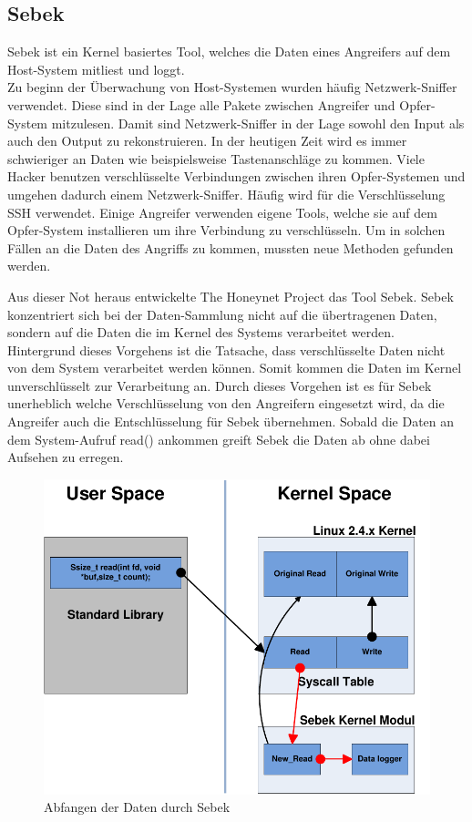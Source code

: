 \subsection{Sebek}
Sebek ist ein Kernel basiertes Tool, welches die Daten eines Angreifers auf dem Host-System mitliest und loggt.\\ Zu beginn der Überwachung von Host-Systemen wurden häufig Netzwerk-Sniffer verwendet. Diese sind in der Lage alle Pakete zwischen Angreifer und Opfer-System mitzulesen. Damit sind Netzwerk-Sniffer in der Lage sowohl den Input als auch den Output zu rekonstruieren. In der heutigen Zeit wird es immer schwieriger an Daten wie beispielsweise Tastenanschläge zu kommen. Viele Hacker benutzen verschlüsselte Verbindungen zwischen ihren Opfer-Systemen und umgehen dadurch einem Netzwerk-Sniffer. Häufig wird für die Verschlüsselung SSH verwendet. Einige Angreifer verwenden eigene Tools, welche sie auf dem Opfer-System installieren um ihre Verbindung zu verschlüsseln. Um in solchen Fällen an die Daten des Angriffs zu kommen, mussten neue Methoden gefunden werden.

Aus dieser Not heraus entwickelte The Honeynet Project das Tool Sebek. Sebek konzentriert sich bei der Daten-Sammlung nicht auf die übertragenen Daten, sondern auf die Daten die im Kernel des Systems verarbeitet werden. Hintergrund dieses Vorgehens ist die Tatsache, dass verschlüsselte Daten nicht von dem System verarbeitet werden können. Somit kommen die Daten im Kernel unverschlüsselt zur Verarbeitung an. Durch dieses Vorgehen ist es für Sebek unerheblich welche Verschlüsselung von den Angreifern eingesetzt wird, da die Angreifer auch die Entschlüsselung für Sebek übernehmen. Sobald die Daten an dem System-Aufruf read() ankommen greift Sebek die Daten ab ohne dabei Aufsehen zu erregen.  

\begin{figure}[ht]
    \centering\includegraphics[scale=0.70]{Bilder/Sebek.pdf}
  \caption{Abfangen der Daten durch Sebek\cite{project.2003b}}
  \label{hnet:sebek}
\end{figure}

